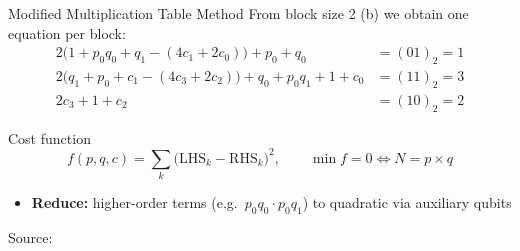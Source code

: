 \documentclass[18pt,aspectratio=169]{beamer}
\begin{document}
\begin{frame}{Modified Multiplication Table Method}
\small
From block size 2 (b) we obtain one equation per block:
\begin{align*}
2\bigl(1 + p_0q_0 + q_1 - (4c_1 + 2c_0)\bigr) + p_0 + q_0 &= (01)_2 = 1\\
2\bigl(q_1 + p_0 + c_1 - (4c_3 + 2c_2)\bigr) + q_0 + p_0q_1 + 1 + c_0 &= (11)_2 = 3\\
2c_3 + 1 + c_2 &= (10)_2 = 2
\end{align*}

\begin{block}{Cost function}
\begin{equation*}
f(p,q,c) = \sum_k \bigl(\text{LHS}_k - \text{RHS}_k\bigr)^2, \qquad \min f = 0 \iff N = p \times q
\end{equation*}
\end{block}
\vspace{-0.5em}
\begin{itemize}
    \item \textbf{Reduce:} higher-order terms (e.g.\ $p_0q_0\cdot p_0q_1$) to quadratic via auxiliary qubits
\end{itemize}

\vfill
\footnotesize Source:~\cite{Hanussek_2024_BSc,Jiang_2018}
\end{frame}
\end{document}
